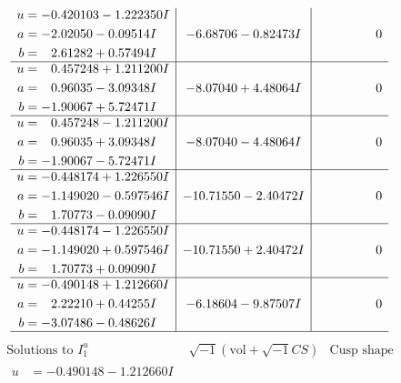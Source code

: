 \documentclass[1p]{elsarticle_modified}
\theoremstyle{definition}
\newcommand{\I}{\sqrt{-1}}
\begin{document}
$$\begin{array}{c|c|c}
\begin{aligned}
u &= -0.420103 - 1.222350 I \\
a &= -2.02050 - 0.09514 I \\
b &= \phantom{-}2.61282 + 0.57494 I\end{aligned}
 & -6.68706 - 0.82473 I & \phantom{-0.000000 } 0 \\ \hline\begin{aligned}
u &= \phantom{-}0.457248 + 1.211200 I \\
a &= \phantom{-}0.96035 - 3.09348 I \\
b &= -1.90067 + 5.72471 I\end{aligned}
 & -8.07040 + 4.48064 I & \phantom{-0.000000 } 0 \\ \hline\begin{aligned}
u &= \phantom{-}0.457248 - 1.211200 I \\
a &= \phantom{-}0.96035 + 3.09348 I \\
b &= -1.90067 - 5.72471 I\end{aligned}
 & -8.07040 - 4.48064 I & \phantom{-0.000000 } 0 \\ \hline\begin{aligned}
u &= -0.448174 + 1.226550 I \\
a &= -1.149020 - 0.597546 I \\
b &= \phantom{-}1.70773 - 0.09090 I\end{aligned}
 & -10.71550 - 2.40472 I & \phantom{-0.000000 } 0 \\ \hline\begin{aligned}
u &= -0.448174 - 1.226550 I \\
a &= -1.149020 + 0.597546 I \\
b &= \phantom{-}1.70773 + 0.09090 I\end{aligned}
 & -10.71550 + 2.40472 I & \phantom{-0.000000 } 0 \\ \hline\begin{aligned}
u &= -0.490148 + 1.212660 I \\
a &= \phantom{-}2.22210 + 0.44255 I \\
b &= -3.07486 - 0.48626 I\end{aligned}
 & -6.18604 - 9.87507 I & \phantom{-0.000000 } 0\\
 \hline 
 \end{array}$$\newpage$$\begin{array}{c|c|c}  
\text{Solutions to }I^u_{1}& \I (\text{vol} + \sqrt{-1}CS) & \text{Cusp shape}\\
 \hline 
\begin{aligned}
u &= -0.490148 - 1.212660 I \\

\end{aligned}
\end{array}$$
\end{document}
